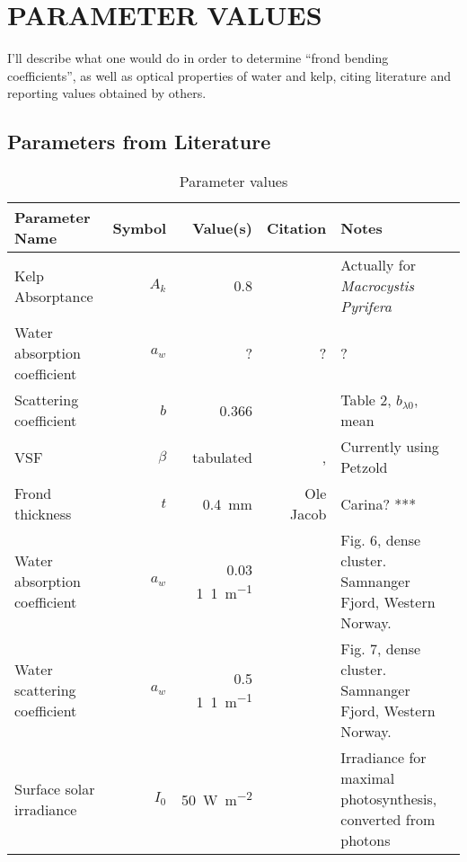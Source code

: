 \chapter{PARAMETER VALUES} \label{ch:experiment}

I'll describe what one would do in order to determine
``frond bending coefficients'', as well as optical properties of water and kelp,
citing literature and reporting values obtained by others.

\section{Parameters from Literature}
\begin{table}
  \centering
  \begin{tabular}{p{}rrrp{}}
    \toprule
    Parameter Name & Symbol & Value(s) & Citation & Notes \\
    \midrule
    Kelp Absorptance & $A_k$ & 0.8 & \cite{colombo-pallotta_photosynthetic_2006} & Actually for \textit{Macrocystis Pyrifera}\\
    Water absorption coefficient & $a_w$ & ? & ? & ? \\
    Scattering coefficient & $b$ & 0.366 & \cite{sokolov_parameterization_2010} & Table 2, $b_{\lambda 0}$, mean \\
    VSF & $\beta$ & tabulated & \cite{petzold_volume_1972,sokolov_parameterization_2010}, & Currently using Petzold \\ 
    Frond thickness & $t$ & \SI{0.4}{\mm} & Ole Jacob & Carina?  *** \\
    Water absorption coefficient & $a_w$ & 0.03 \SI{1}{1\per\m} & \cite{hamre_parameterization_2003} & Fig. 6, dense cluster. Samnanger Fjord, Western Norway. \\
    Water scattering coefficient & $a_w$ & 0.5 \SI{1}{1\per\m} & \cite{hamre_parameterization_2003} & Fig. 7, dense cluster. Samnanger Fjord, Western Norway. \\
    Surface solar irradiance & $I_0$ & \SI{50}{\W\per\m\squared} & \cite{broch_modelling_2012} & Irradiance for maximal photosynthesis, converted from photons \\
    \bottomrule
  \end{tabular}
  \caption{Parameter values}
\end{table}

